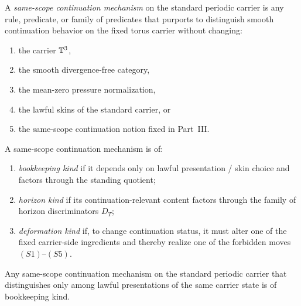 \begin{manualdefinition}
\label{def:same-scope-continuation-mechanism}
A \emph{same-scope continuation mechanism} on the standard periodic carrier is any rule,
predicate, or family of predicates that purports to distinguish smooth continuation behavior on the
fixed torus carrier without changing:
\begin{enumerate}[label=(\roman*), leftmargin=2.2em]
\item the carrier $\mathbb{T}^3$,
\item the smooth divergence-free category,
\item the mean-zero pressure normalization,
\item the lawful skins of the standard carrier, or
\item the same-scope continuation notion fixed in Part~III.
\end{enumerate}
\end{manualdefinition}

\begin{manualdefinition}
\label{def:three-continuation-kinds}
A same-scope continuation mechanism is of:
\begin{enumerate}[label=(\roman*), leftmargin=2.2em]
\item \emph{bookkeeping kind} if it depends only on lawful presentation / skin choice and factors
through the standing quotient;
\item \emph{horizon kind} if its continuation-relevant content factors through the family of horizon
discriminators $D_T$;
\item \emph{deformation kind} if, to change continuation status, it must alter one of the fixed
carrier-side ingredients and thereby realize one of the forbidden moves $(S1)$--$(S5)$.
\end{enumerate}
\end{manualdefinition}

\begin{manualproposition}
\label{prop:lawful-skin-factorization}
Any same-scope continuation mechanism on the standard periodic carrier that distinguishes only among
lawful presentations of the same carrier state is of bookkeeping kind.
\end{manualproposition}

